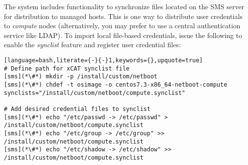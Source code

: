 The \xCAT{} system includes functionality to synchronize files located on the
SMS server for distribution to managed hosts. This is one way to
distribute user credentials to {\em compute} nodes (alternatively, you may
prefer to use a central authentication service like LDAP). To import local file-based
credentials, issue the following to enable the {\em synclist} feature and
register user credential files:

\begin{lstlisting}[language=bash,literate={-}{-}1,keywords={},upquote=true]
# Define path for xCAT synclist file
[sms](*\#*) mkdir -p /install/custom/netboot
[sms](*\#*) chdef -t osimage -o centos7.3-x86_64-netboot-compute synclists="/install/custom/netboot/compute.synclist"

# Add desired credential files to synclist
[sms](*\#*) echo "/etc/passwd -> /etc/passwd" > /install/custom/netboot/compute.synclist
[sms](*\#*) echo "/etc/group -> /etc/group" >> /install/custom/netboot/compute.synclist
[sms](*\#*) echo "/etc/shadow -> /etc/shadow" >> /install/custom/netboot/compute.synclist
\end{lstlisting}
